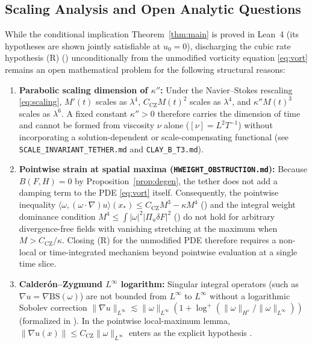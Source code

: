 \documentclass[11pt,a4paper]{article}
\theoremstyle{plain}
\theoremstyle{definition}
\theoremstyle{remark}
\newcommand{\CZ}{C_{\mathrm{CZ}}}
\begin{document}
\subsection{Scaling Analysis and Open Analytic Questions}\label{sec:obstruction}\label{sec:open}
While the conditional implication Theorem~\ref{thm:main} is proved in Lean~4 (its hypotheses are shown jointly satisfiable at $u_0=0$), discharging the cubic rate hypothesis (R) () unconditionally from the unmodified vorticity equation \eqref{eq:vort} remains an open mathematical problem for the following structural reasons:
\begin{enumerate}
\item \textbf{Parabolic scaling dimension of $\kappa''$:} Under the Navier--Stokes rescaling \eqref{eq:scaling}, $M'(t)$ scales as $\lambda^4$, $\CZ M(t)^2$ scales as $\lambda^4$, and $\kappa'' M(t)^3$ scales as $\lambda^6$. A fixed constant $\kappa''>0$ therefore carries the dimension of time and cannot be formed from viscosity $\nu$ alone ($[\nu]=L^2T^{-1}$) without incorporating a solution-dependent or scale-compensating functional (see \texttt{SCALE\_INVARIANT\_TETHER.md} and \texttt{CLAY\_B\_T3.md}).
\item \textbf{Pointwise strain at spatial maxima (\texttt{HWEIGHT\_OBSTRUCTION.md}):} Because $B(F,H)=0$ by Proposition~\ref{prop:degen}, the tether does not add a damping term to the PDE \eqref{eq:vort} itself. Consequently, the pointwise inequality $\langle\omega,(\omega\cdot\nabla)u\rangle(x_*)\le\CZ M^3-\kappa M^4$ () and the integral weight dominance condition $M^4\le\int|\omega|^2|\Pi_u\delta F|^2$ () do not hold for arbitrary divergence-free fields with vanishing stretching at the maximum when $M>\CZ/\kappa$. Closing (R) for the unmodified PDE therefore requires a non-local or time-integrated mechanism beyond pointwise evaluation at a single time slice.
\item \textbf{Calderón--Zygmund $L^\infty$ logarithm:} Singular integral operators (such as $\nabla u=\nabla\mathrm{BS}(\omega)$) are not bounded from $L^\infty$ to $L^\infty$ without a logarithmic Sobolev correction $\|\nabla u\|_{L^\infty}\lesssim \|\omega\|_{L^\infty}(1+\log^+(\|\omega\|_{H^s}/\|\omega\|_{L^\infty}))$ \cite{BKM1984} (formalized in ). In the pointwise local-maximum lemma, $\|\nabla u(x)\|\le\CZ\|\omega\|_{L^\infty}$ enters as the explicit hypothesis .
\end{enumerate}
\end{document}
